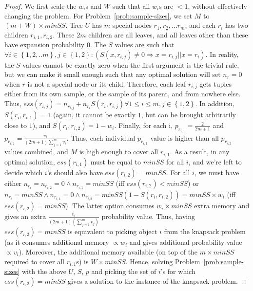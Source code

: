 {\begin{proof}
We first scale the $w_i$s and $W$ such that all $w_i$s are $< 1$, without effectively changing the problem. For Problem~\ref{prob:sample-sizes}, we set $M$ to $(m + W) \times minSS$. Tree $U$ has $m$ special nodes $r_1, r_2, ... r_m$, and each $r_i$ has two children $r_{i,1}, r_{i,2}$. These $2m$ children are all leaves, and all leaves other than these have expansion probability $0$. 
The $S$ values are such that $\forall i \in \left\lbrace 1, 2, ..m\right\rbrace, j \in \left\lbrace 1, 2 \right\rbrace : (S(x, r_{i,j}) \neq 0 \Rightarrow x = r_{i,j} || x = r_i)$. In reality, the $S$ values cannot be exactly zero when the first argument is the trivial rule, but we can make it small enough such that any optimal solution will set $n_r = 0$ when $r$ is not a special node or its child. Therefore, each leaf $r_{i,j}$ gets tuples either from its own sample, or the sample of its parent, and from nowhere else. Thus, $ess(r_{i,j}) = n_{r_{i,j}} + n_{r_i}S(r_i, r_{i,j}) \forall 1 \leq i \leq m, j \in \left\lbrace 1,2 \right\rbrace$. In addition, $S(r_i, r_{i,1}) = 1$ (again, it cannot be exactly $1$, but can be brought arbitrarily close to $1$), and $S(r_i, r_{i,2}) = 1 - w_i$. Finally, for each i, $p_{r_{i,1}} = \frac{2}{2m+1}$ and $p_{r_{i,2}} = \frac{v_i}{(2m+1)\sum_{j=1}^{m}v_i}$. Thus, each individual $p_{r_{i,1}}$ value is higher than all $p_{r_{i,2}}$ values combined, and $M$ is high enough to cover all $r_{i,1}$. As a result, in any optimal solution, $ess(r_{i,1})$ must be equal to $minSS$ for all $i$, and we're left to decide which $i$'s should also have $ess(r_{i,2}) = minSS$. For all $i$, we must have either $n_{r_i} = n_{r_{i,2}} = 0 \land n_{r_{i,1}} = minSS$ (iff $ess(r_{i,2}) < minSS$) or $n_{r_i} = minSS \land n_{r_{i,1}} = 0 \land n_{r_{i,2}} = minSS (1 - S(r_i, r_{i,2})) = minSS \times w_i$ (iff $ess(r_{i,2}) = minSS$). The latter option consumes $w_i \times minSS$ extra memory and gives an extra $\frac{v_i}{(2m+1)(\sum_{j=1}^{m}v_j)}$ probability value. Thus, having $ess(r_{i,2}) = minSS$ is equivalent to picking object $i$ from the knapsack problem (as it consumes additional memory $\propto w_i$ and gives additional probability value $\propto v_i$). Moreover, the additional memory available (on top of the $m \times minSS$ required to cover all $r_{i,1}$s) is $W\times minSS$. Hence, solving Problem~\ref{prob:sample-sizes} with the above $U$, $S$, $p$ and picking the set of $i$'s for which $ess(r_{i,2}) = minSS$ gives a solution to the instance of the knapsack problem. 
\end{proof}
}

